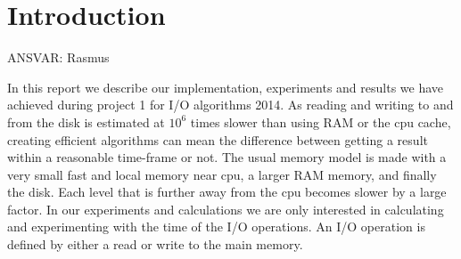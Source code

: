 \section{Introduction}

ANSVAR: Rasmus

In this report we describe our implementation, experiments and results we have achieved during project 1 for I/O algorithms 2014.
As reading and writing to and from the disk is estimated at ${10^{6}}$ times slower than using RAM or the cpu cache, creating efficient algorithms can mean the difference between getting a result within a reasonable time-frame or not. 
The usual memory model is made with a very small fast and local memory near cpu, a larger RAM memory, and finally the disk. Each level that is further away from the cpu becomes slower by a large factor. In our experiments and calculations we are only interested in calculating and experimenting with the time of the I/O operations. An I/O operation is defined by either a read or write to the main memory.


